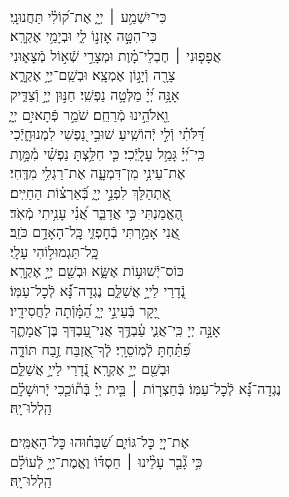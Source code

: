 \documentclass[twoside, openany, parskip=half, 11pt]{book}
\begin{document}
{\begin{narrow}
\\
כִּי־יִשְׁמַ֥ע ׀ יְיָ֑ \hfill אֶת־ק֝וֹלִ֗י תַּחֲנוּנָֽי׃ \\
כִּי־הִטָּ֣ה אׇזְנ֣וֹ לִ֑י \hfill וּבְיָמַ֥י אֶקְרָֽא׃ \\
אֲפָפ֤וּנִי ׀ חֶבְלֵי־מָ֗וֶת \hfill וּמְצָרֵ֣י שְֿׁא֣וֹל מְֿצָא֑וּנִי\\ צָרָ֖ה וְֿיָג֣וֹן אֶמְצָֽא׃ \hfill
וּבְשֵֽׁם־יְיָ֥ אֶקְרָ֑א\\ אָנָּ֥ה יְ֝יָ֗ מַלְּטָ֥ה נַפְשִֽׁי׃ \hfill
חַנּ֣וּן יְיָ֣ וְֿצַדִּ֑יק\\ וֵ֖אלֹהֵ֣ינוּ מְֿרַחֵֽם׃ \hfill
שֹׁמֵ֣ר פְּֿתָאיִ֣ם יְיָ֑\\ דַּ֝לֹּתִ֗י וְֿלִ֣י יְֿהוֹשִֽׁיעַ׃ \hfill
שׁוּבִ֣י נַ֭פְשִׁי לִמְנוּחָ֑יְֿכִי\\ כִּֽי־יְ֝יָ֗ גָּמַ֥ל עָלָֽיְֿכִי׃ \hfill
כִּ֤י חִלַּ֥צְתָּ נַפְשִׁ֗י מִ֫מָּ֥וֶת\\ אֶת־עֵינִ֥י מִן־דִּמְעָ֑ה \hfill אֶת־רַגְלִ֥י מִדֶּֽחִי׃ \\
אֶ֭תְהַלֵּךְ לִפְנֵ֣י יְיָ֑ \hfill בְּֿ֝אַרְצ֗וֹת הַחַיִּֽים׃ \\
הֶ֭אֱמַנְתִּי כִּ֣י אֲדַבֵּ֑ר \hfill אֲ֝נִ֗י עָנִ֥יתִי מְֿאֹֽד׃ \\
אֲ֭נִי אָמַ֣רְתִּי בְֿחׇפְזִ֑י \hfill כׇּֽל־הָאָדָ֥ם כֹּזֵֽב׃ \\

 \hfill
כׇּֽל־תַּגְמוּל֥וֹהִי עָלָֽי׃ \\
כּוֹס־יְֿשׁוּע֥וֹת אֶשָּׂ֑א \hfill וּבְשֵׁ֖ם יְיָ֣ אֶקְרָֽא׃ \\
נְֿ֭דָרַי לַייָ֣ אֲשַׁלֵּ֑ם \hfill נֶגְדָה־נָּ֗֝א לְֿכׇל־עַמּֽוֹ׃ \\
יָ֭קָר בְּֿעֵינֵ֣י יְיָ֑ \hfill הַ֝מָּ֗וְֿתָה לַחֲסִידָֽיו׃ \\
אָנָּ֣ה יְיָ כִּֽי־אֲנִ֢י עַ֫בְדֶּ֥ךָ \hfill אֲנִי־עַ֭בְדְּךָ בֶּן־אֲמָתֶ֑ךָ\\ פִּ֝תַּ֗חְתָּ לְֿמֽוֹסֵרָֽי׃ \hfill
לְֽֿךָ־אֶ֭זְבַּח זֶ֣בַח תּוֹדָ֑ה\\ וּבְשֵׁ֖ם יְיָ֣ אֶקְרָֽא׃ \hfill
נְֿ֭דָרַי לַייָ֣ אֲשַׁלֵּ֑ם \\ נֶגְדָה־נָּ֗֝א לְֿכׇל־עַמּֽוֹ׃ \hfill
בְּֿחַצְר֤וֹת ׀ בֵּ֤ית יְיָ֗ בְּֽֿת֘וֹכֵ֤כִי יְֽֿרוּשָׁלָ֗‍ִם\\
הַֽלְלוּ־יָֽהּ׃ \hfill \break



אֶת־יְיָ֭ כׇּל־גּוֹיִ֑ם \hfill שַׁ֝בְּח֗וּהוּ כׇּל־הָאֻמִּֽים׃ \\
כִּ֥י גָ֘בַ֤ר עָלֵ֨ינוּ ׀ חַסְדּ֗וֹ \hfill וֶאֱמֶת־יְיָ֥ לְֿעוֹלָ֗ם\\
הַֽלְלוּ־יָֽהּ׃ \hfill \break


\end{narrow}}
\end{document}
